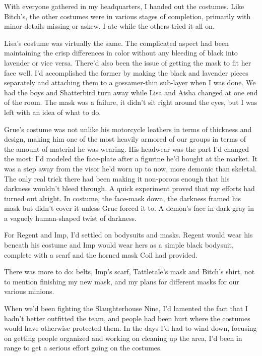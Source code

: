 With everyone gathered in my headquarters, I handed out the costumes.  Like Bitch's, the other costumes were in various stages of completion, primarily with minor details missing or askew.  I ate while the others tried it all on.



Lisa's costume was virtually the same.  The complicated aspect had been maintaining the crisp differences in color without any bleeding of black into lavender or vice versa.  There'd also been the issue of getting the mask to fit her face well.  I'd accomplished the former by making the black and lavender pieces separately and attaching them to a gossamer-thin sub-layer when I was done.  We had the boys and Shatterbird turn away while Lisa and Aisha changed at one end of the room.  The mask was a failure, it didn't sit right around the eyes, but I was left with an idea of what to do.



Grue's costume was not unlike his motorcycle leathers in terms of thickness and design, making him one of the most heavily armored of our groups in terms of the amount of material he was wearing.  His headwear was the part I'd changed the most: I'd modeled the face-plate after a figurine he'd bought at the market.  It was a step away from the visor he'd worn up to now, more demonic than skeletal.  The only real trick there had been making it non-porous enough that his darkness wouldn't bleed through.  A quick experiment proved that my efforts had turned out alright.  In costume, the face-mask down, the darkness framed his mask but didn't cover it unless Grue forced it to.  A demon's face in dark gray in a vaguely human-shaped twist of darkness.



For Regent and Imp, I'd settled on bodysuits and masks.  Regent would wear his beneath his costume and Imp would wear hers as a simple black bodysuit, complete with a scarf and the horned mask Coil had provided.



There was more to do: belts, Imp's scarf, Tattletale's mask and Bitch's shirt, not to mention finishing my new mask, and my plans for different masks for our various minions.



When we'd been fighting the Slaughterhouse Nine, I'd lamented the fact that I hadn't better outfitted the team, and people had been hurt where the costumes would have otherwise protected them.  In the days I'd had to wind down, focusing on getting people organized and working on cleaning up the area, I'd been in range to get a serious effort going on the costumes.



